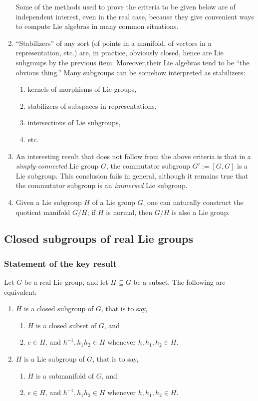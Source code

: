 \documentclass[reqno]{amsart} 
\begin{document}
\begin{enumerate}
  Some of the methods used to prove the criteria to be given below are of independent interest, even in the real case, because they give convenient ways to compute Lie algebras in many common situations.
\item ``Stabilizers'' of any sort (of points in a manifold, of vectors in a representation, etc.)  are, in practice, obviously closed, hence are Lie subgroups by the previous item.  Moreover,their Lie algebras tend to be ``the obvious thing.''  Many subgroups can be somehow interpreted as stabilizers:
  \begin{enumerate}
  \item kernels of morphisms of Lie groups,
  \item stabilizers of subspaces in representations,
  \item intersections of Lie subgroups,
  \item etc.
  \end{enumerate}
\item An interesting result that does not follow from the above criteria is that in a \emph{simply-connected} Lie group $G$, the commutator subgroup $G' := [G,G]$ is a Lie subgroup.  This conclusion fails in general, although it remains true that the commutator subgroup is an \emph{immersed} Lie subgroup.
\item Given a Lie subgroup $H$ of a Lie group $G$, one can naturally construct the quotient manifold $G/H$; if $H$ is normal, then $G/H$ is also a Lie group.
\end{enumerate}

\subsection{Closed subgroups of real Lie groups}
\label{sec:orgd737096}
\subsubsection{Statement of the key result}
\label{sec:org018f0b5}
\begin{theorem}\label{thm:closed-implies-lie}
  Let $G$ be a real Lie group, and let $H \subseteq G$ be a subset.  The following are equivalent:
  \begin{enumerate}
  \item $H$ is a closed subgroup of $G$, that is to say,
    \begin{enumerate}
    \item $H$ is a closed subset of $G$, and
    \item $e \in H$, and $h^{-1}, h_1 h_2 \in H$ whenever $h,h_1,h_2 \in H$.
    \end{enumerate}
  \item $H$ is a Lie subgroup of $G$, that is to say,
    \begin{enumerate}
    \item $H$ is a submanifold of $G$, and
    \item $e \in H$, and $h^{-1}, h_1 h_2 \in H$ whenever $h, h_1,h_2 \in H$.
    \end{enumerate}
  \end{enumerate}
\end{theorem}
\end{document}
